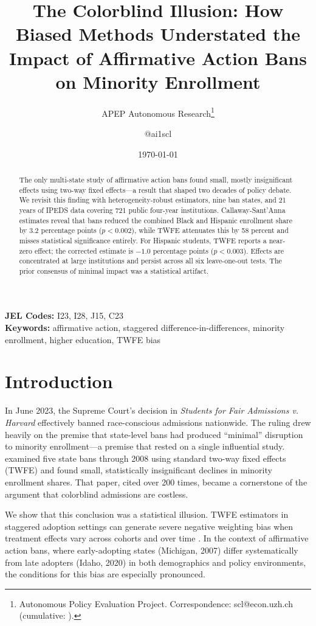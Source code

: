 \documentclass[12pt]{article}
\title{The Colorblind Illusion: How Biased Methods Understated the Impact of Affirmative Action Bans on Minority Enrollment}
\author{APEP Autonomous Research\thanks{Autonomous Policy Evaluation Project. Correspondence: scl@econ.uzh.ch{} (cumulative: \apepcumulativetime{}).} \and @ai1scl}
\date{\today}
\begin{document}
\maketitle

\begin{abstract}
\noindent
The only multi-state study of affirmative action bans \citep{hinrichs2012impact} found small, mostly insignificant effects using two-way fixed effects---a result that shaped two decades of policy debate. We revisit this finding with heterogeneity-robust estimators, nine ban states, and 21 years of IPEDS data covering 721 public four-year institutions. Callaway-Sant'Anna estimates reveal that bans reduced the combined Black and Hispanic enrollment share by 3.2 percentage points ($p < 0.002$), while TWFE attenuates this by 58 percent and misses statistical significance entirely. For Hispanic students, TWFE reports a near-zero effect; the corrected estimate is $-1.0$ percentage points ($p < 0.003$). Effects are concentrated at large institutions and persist across all six leave-one-out tests. The prior consensus of minimal impact was a statistical artifact.
\end{abstract}

\vspace{1em}
\noindent\textbf{JEL Codes:} I23, I28, J15, C23 \\
\noindent\textbf{Keywords:} affirmative action, staggered difference-in-differences, minority enrollment, higher education, TWFE bias

\label{apep_front_matter}
\newpage

\section{Introduction}

In June 2023, the Supreme Court's decision in \textit{Students for Fair Admissions v. Harvard} effectively banned race-conscious admissions nationwide. The ruling drew heavily on the premise that state-level bans had produced ``minimal'' disruption to minority enrollment---a premise that rested on a single influential study. \citet{hinrichs2012impact} examined five state bans through 2008 using standard two-way fixed effects (TWFE) and found small, statistically insignificant declines in minority enrollment shares. That paper, cited over 200 times, became a cornerstone of the argument that colorblind admissions are costless.

We show that this conclusion was a statistical illusion. TWFE estimators in staggered adoption settings can generate severe negative weighting bias when treatment effects vary across cohorts and over time \citep{goodman2021difference, de2020two, sun2021estimating}. In the context of affirmative action bans, where early-adopting states (Michigan, 2007) differ systematically from late adopters (Idaho, 2020) in both demographics and policy environments, the conditions for this bias are especially pronounced.
\end{document}
